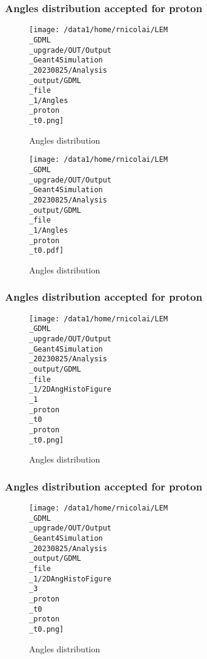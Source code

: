 \documentclass[8pt]{beamer}
\begin{document}
            \begin{frame}
                \frametitle{Angles distribution accepted for proton}
            
        \begin{figure}[h]
            \centering
            \texttt{[image: /data1/home/rnicolai/LEM\\\_GDML\\\_upgrade/OUT/Output\\\_Geant4Simulation\\\_20230825/Analysis\\\_output/GDML\\\_file\\\_1/Angles\\\_proton\\\_t0.png]}
            \caption{Angles distribution}
        \end{figure}
        
        \begin{figure}[h]
            \centering
            \texttt{[image: /data1/home/rnicolai/LEM\\\_GDML\\\_upgrade/OUT/Output\\\_Geant4Simulation\\\_20230825/Analysis\\\_output/GDML\\\_file\\\_1/Angles\\\_proton\\\_t0.pdf]}
            \caption{Angles distribution}
        \end{figure}
        
            \end{frame}
            
            \begin{frame}
                \frametitle{Angles distribution accepted for proton}
            
        \begin{figure}[h]
            \centering
            \texttt{[image: /data1/home/rnicolai/LEM\\\_GDML\\\_upgrade/OUT/Output\\\_Geant4Simulation\\\_20230825/Analysis\\\_output/GDML\\\_file\\\_1/2DAngHistoFigure\\\_1\\\_proton\\\_t0\\\_proton\\\_t0.png]}
            \caption{Angles distribution}
        \end{figure}
        
            \end{frame}
            
            \begin{frame}
                \frametitle{Angles distribution accepted for proton}
            
        \begin{figure}[h]
            \centering
            \texttt{[image: /data1/home/rnicolai/LEM\\\_GDML\\\_upgrade/OUT/Output\\\_Geant4Simulation\\\_20230825/Analysis\\\_output/GDML\\\_file\\\_1/2DAngHistoFigure\\\_3\\\_proton\\\_t0\\\_proton\\\_t0.png]}
            \caption{Angles distribution}
        \end{figure}
        
            \end{frame}
            
\end{document}
